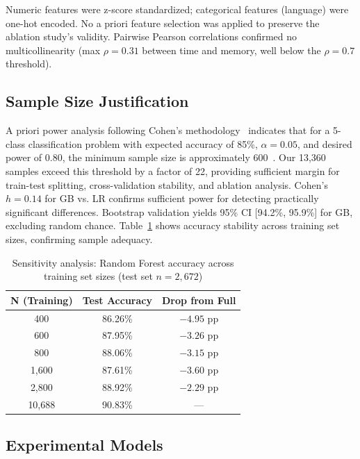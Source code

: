 \documentclass[10pt,a4paper]{article}
\begin{document}
Numeric features were z-score standardized; categorical features (language)
were one-hot encoded. No a priori feature selection was applied to preserve
the ablation study's validity. Pairwise Pearson correlations confirmed no
multicollinearity (max $\rho = 0.31$ between time and memory, well below the
$\rho = 0.7$ threshold).

\subsection{Sample Size Justification}

A priori power analysis following Cohen's methodology~\cite{cohen1988statistical}
indicates that for a 5-class classification problem with expected accuracy of
85\%, $\alpha = 0.05$, and desired power of 0.80, the minimum sample size is
approximately 600~\cite{lachenbruch1998power}. Our 13,360 samples exceed this
threshold by a factor of 22, providing sufficient margin for train-test
splitting, cross-validation stability, and ablation analysis. Cohen's
$h = 0.14$ for GB vs. LR confirms sufficient power for detecting practically
significant differences. Bootstrap validation yields 95\% CI [94.2\%, 95.9\%]
for GB, excluding random chance. Table~\ref{tab:sensitivity} shows accuracy
stability across training set sizes, confirming sample adequacy.

\begin{table}[htbp]
\centering
\caption{Sensitivity analysis: Random Forest accuracy across training set
         sizes (test set $n=2{,}672$)}
\label{tab:sensitivity}
\begin{tabular}{@{}ccc@{}}
\toprule
N (Training) & Test Accuracy & Drop from Full \\
\midrule
400   & 86.26\% & $-4.95$ pp \\
600   & 87.95\% & $-3.26$ pp \\
800   & 88.06\% & $-3.15$ pp \\
1,600 & 87.61\% & $-3.60$ pp \\
2,800 & 88.92\% & $-2.29$ pp \\
10,688 & 90.83\% & --- \\
\bottomrule
\end{tabular}
\end{table}

\subsection{Experimental Models}
\end{document}
